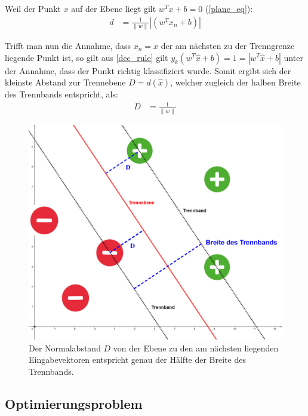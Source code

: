 \documentclass[a4paper,11pt,twoside]{scrreprt}
\newcommand{\norm}[1]{\lVert#1\rVert}
\begin{document}
Weil der Punkt $x$ auf der Ebene liegt gilt $w^{T} x + b = 0$ (\autoref{plane_eq}):
\begin{equation} \label{distance_to_plane_simplified1}
	\begin{aligned}
		d &= \frac{1}{\norm{w}} | (w^{T} x_{n} + b) |
	\end{aligned}
\end{equation}

Trifft man nun die Annahme, dass $x_{n} = \hat{x}$ der am nächsten zu der Trenngrenze liegende Punkt ist, so gilt aus \autoref{dec_rule} gilt $y_{k} (w^{T} \hat{x} + b) = 1 = |w^{T} \hat{x} + b|$ unter der Annahme, dass der Punkt richtig klassifiziert wurde. Somit ergibt sich der kleinste Abstand zur Trennebene $D = d(\hat{x})$, welcher zugleich der halben Breite des Trennbands entspricht, als:
\begin{equation} \label{distance_to_plane_simplified2}
	\begin{aligned}
		D &= \frac{1}{\norm{w}}
	\end{aligned}
\end{equation}

\begin{figure}[H]
	\centering
	\includegraphics[width = 12cm]{assets/trennband_mit_D.png}
	\caption{Der Normalabstand $D$ von der Ebene zu den am nächsten liegenden Eingabevektoren entspricht genau der Hälfte der Breite des Trennbands.}
	\label{fig:trennband2}
\end{figure}


\subsection{Optimierungsproblem}
\end{document}
